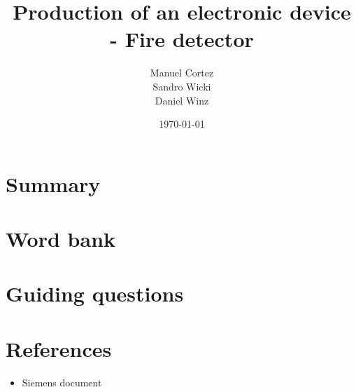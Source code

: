 \documentclass[a4paper]{article}
\title{Production of an electronic device - Fire detector}
\author{Manuel Cortez\\Sandro Wicki\\Daniel Winz}
\date{\today}
\begin{document}
\maketitle

\section{Summary}


\section{Word bank}


\section{Guiding questions}


\section{References}
\begin{itemize}
    \item Siemens document
\end{itemize}
\nocite{*}

\end{document}

